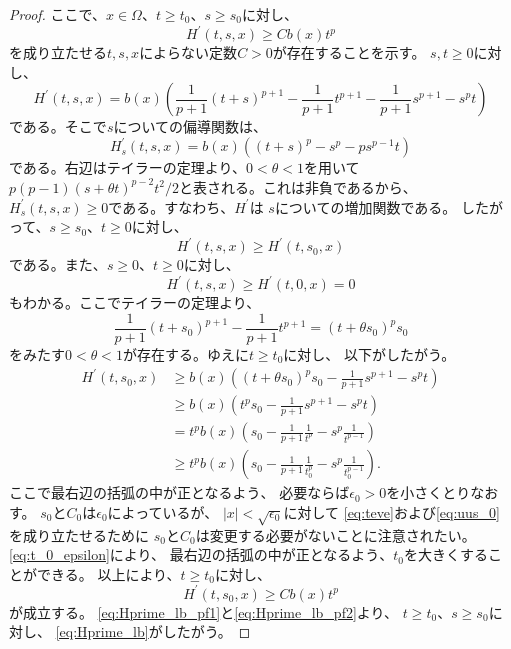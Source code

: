\begin{proof}
ここで、$x \in \Omega$、$t \geq t_0$、$s \geq s_0$に対し、
\begin{equation}
 H^\prime (t, s, x) \geq C b(x) t^p \label{eq:Hprime_lb}
\end{equation}
を成り立たせる$t, s, x$によらない定数$C>0$が存在することを示す。
$s, t \geq 0$に対し、
\[
 H^\prime(t, s, x) = b(x) \left( \frac{1}{p+1}(t+s)^{p+1} -
 \frac{1}{p+1} t^{p+1} - \frac{1}{p+1} s^{p+1} - s^p t \right)
\]
である。そこで$s$についての偏導関数は、
\[
 H^\prime_s (t, s, x) = b(x) \left( (t+s)^p - s^p - ps^{p-1}t \right)
\]
である。右辺はテイラーの定理より、$0 < \theta < 1$を用いて
$p(p-1)(s + \theta t)^{p-2}t^2/2$と表される。これは非負であるから、
$H^\prime_s(t, s, x) \geq 0$である。すなわち、$H^\prime$は
$s$についての増加関数である。
したがって、$s \geq s_0$、$t \geq 0$に対し、
\begin{equation}
 H^\prime(t, s, x) \geq H^\prime(t, s_0, x) \label{eq:Hprime_lb_pf1}
\end{equation}
である。また、$s \geq 0$、$t \geq 0$に対し、
\begin{equation}
 H^\prime(t, s, x) \geq H^\prime(t, 0, x) = 0 \label{eq:Hprime_lb_pf3}
\end{equation}
もわかる。ここでテイラーの定理より、
\[
 \frac{1}{p+1} (t + s_0)^{p+1} - \frac{1}{p+1} t^{p+1} = (t + \theta
 s_0)^p s_0
\]
 をみたす$0 < \theta < 1$が存在する。ゆえに$t \geq t_0$に対し、
 以下がしたがう。
 \begin{align*}
  H^\prime(t, s_0, x) &\geq b(x) \left( (t+\theta s_0)^p s_0 -
  \frac{1}{p+1} s^{p+1} - s^p t\right) \\
  & \geq b(x) \left( t^p s_0 - \frac{1}{p+1} s^{p+1} - s^p t \right) \\
  & = t^p b(x) \left( s_0 - \frac{1}{p+1} \frac{1}{t^p} - s^p
  \frac{1}{t^{p-1}}  \right) \\
  & \geq t^p b(x) \left( s_0 - \frac{1}{p+1} \frac{1}{t_0^p} - s^p
  \frac{1}{t_0^{p-1}}  \right).
 \end{align*}
 ここで最右辺の括弧の中が正となるよう、
 必要ならば$\epsilon_0 > 0$を小さくとりなおす。
 $s_0$と$C_0$は$\epsilon_0$によっているが、
 $\lvert x \rvert < \sqrt{\epsilon_0}$に対して
 \eqref{eq:teve}および\eqref{eq:uus_0}を成り立たせるために
 $s_0$と$C_0$は変更する必要がないことに注意されたい。
 \eqref{eq:t_0_epsilon}により、
 最右辺の括弧の中が正となるよう、$t_0$を大きくすることができる。
 以上により、$t \geq t_0$に対し、
 \begin{equation}
  H^\prime (t, s_0, x) \geq C b(x) t^p \label{eq:Hprime_lb_pf2}
 \end{equation}
 が成立する。
 \eqref{eq:Hprime_lb_pf1}と\eqref{eq:Hprime_lb_pf2}より、
 $t \geq t_0$、$s \geq s_0$に対し、
 \eqref{eq:Hprime_lb}がしたがう。


\end{proof}
